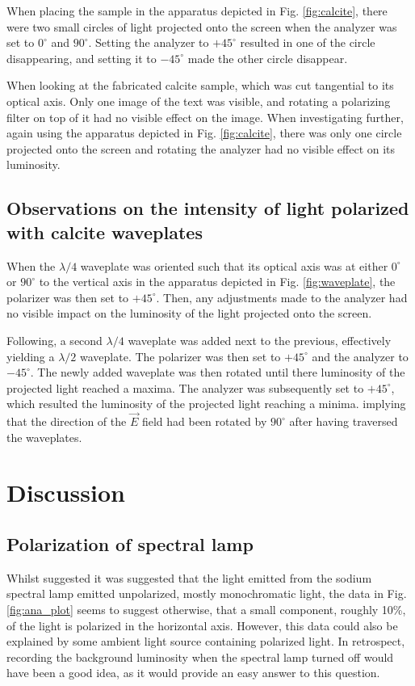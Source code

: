 \documentclass[11pt,a4paper, twocolumn]{article}
\begin{document}
    When placing the sample in the apparatus depicted in Fig. \ref{fig:calcite}, there were two small circles of light projected onto the screen when the analyzer was set to $0^\circ$ and $90^\circ$.  Setting the analyzer to $+45^\circ$ resulted in one of the circle disappearing, and setting it to $-45^\circ$ made the other circle disappear.

    When looking at the fabricated calcite sample, which was cut tangential to its optical axis. Only one image of the text was visible, and rotating a polarizing filter on top of it had no visible effect on the image. When investigating further, again using the apparatus depicted in Fig. \ref{fig:calcite}, there was only one circle projected onto the screen and rotating the analyzer had no visible effect on its luminosity. 

  \subsection{Observations on the intensity of light polarized with calcite waveplates}
    When the $\lambda/4$ waveplate was oriented such that its optical axis was at either $0^\circ$ or $90^\circ$ to the vertical axis in the apparatus depicted in Fig. \ref{fig:waveplate}, the polarizer was then set to $+45^\circ$. Then, any adjustments made to the analyzer had no visible impact on the luminosity of the light projected onto the screen.

    Following, a second $\lambda/4$ waveplate was added next to the previous, effectively yielding a $\lambda/2$ waveplate. The polarizer was then set to $+45^\circ$ and the analyzer to $-45^\circ$. The newly added waveplate was then rotated until there luminosity of the projected light reached a maxima. The analyzer was subsequently set to $+45^\circ$, which resulted the luminosity of the projected light reaching a minima. implying that the direction of the $\vec E$ field had been rotated by $90^\circ$ after having traversed the waveplates.

\section{\label{sect:discuss}Discussion}
  \subsection{Polarization of spectral lamp}
    Whilst suggested it was suggested that the light emitted from the sodium spectral lamp emitted unpolarized, mostly monochromatic light, the data in Fig. \ref{fig:ana_plot} seems to suggest otherwise, that a small component, roughly 10\%, of the light is polarized in the horizontal axis. However, this data could also be explained by some ambient light source containing polarized light. In retrospect, recording the background luminosity when the spectral lamp turned off would have been a good idea, as it would provide an easy answer to this question.
\end{document}
